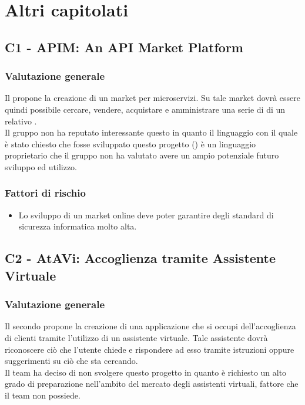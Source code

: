 \section{Altri capitolati}
\subsection{C1 - APIM: An API Market Platform}
\subsubsection{Valutazione generale}
Il  propone la creazione di un  market per microservizi. Su tale market dovrà essere quindi possibile cercare, vendere, acquistare e amministrare una serie di  di un relativo . \\
Il gruppo non ha reputato interessante questo  in quanto il linguaggio con il quale è stato chiesto che fosse sviluppato questo progetto () è un linguaggio proprietario che il gruppo non ha valutato avere un ampio potenziale futuro sviluppo ed utilizzo.

\subsubsection{Fattori di rischio}
\begin{itemize}

	\item Lo sviluppo di un market online deve poter garantire degli standard di sicurezza informatica molto alta.

\end{itemize}

\subsection{C2 - AtAVi: Accoglienza tramite Assistente Virtuale}
\subsubsection{Valutazione generale}
Il secondo  propone la creazione di una applicazione che si occupi dell'accoglienza di clienti tramite l'utilizzo di un assistente virtuale. Tale assistente dovrà riconoscere ciò che l'utente chiede e rispondere ad esso tramite istruzioni oppure suggerimenti su ciò che sta cercando. \\
Il team ha deciso di non svolgere questo progetto in quanto è richiesto un alto grado di preparazione nell'ambito del mercato degli assistenti virtuali, fattore che il team non possiede.

